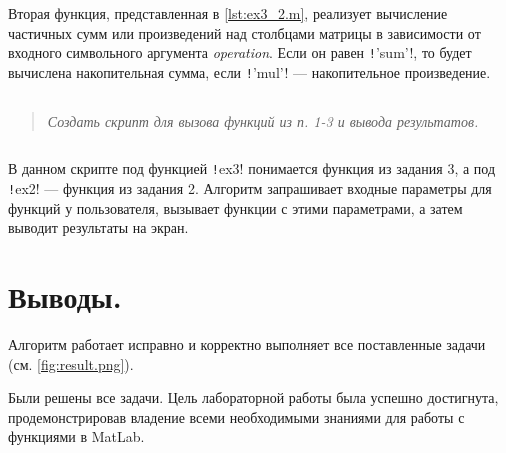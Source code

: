 Вторая функция, представленная в \cref{lst:ex3_2.m}, реализует вычисление частичных сумм или произведений над столбцами матрицы в зависимости от входного символьного аргумента \textit{operation}. Если он равен \texttt!'sum'!, то будет вычислена накопительная сумма, если \texttt!'mul'! --- накопительное произведение.

\subsection*{  }
\begin{quote}
    \textit{Создать скрипт для вызова функций из п. 1-3 и вывода результатов.}
\end{quote}

\begin{codemultipage}
    \inputminted{matlab}{code/ex4.m}
\end{codemultipage}

В данном скрипте под функцией \texttt!ex3! понимается функция из задания 3, а под \texttt!ex2! --- функция из задания 2.
Алгоритм запрашивает входные параметры для функций у пользователя, вызывает функции с этими параметрами, а затем выводит результаты на экран.

\section*{Выводы.}

Алгоритм работает исправно и корректно выполняет все поставленные задачи (см. \cref{fig:result.png}).

Были решены все задачи. Цель лабораторной работы была успешно достигнута, продемонстрировав владение всеми необходимыми знаниями для работы с функциями в MatLab.

